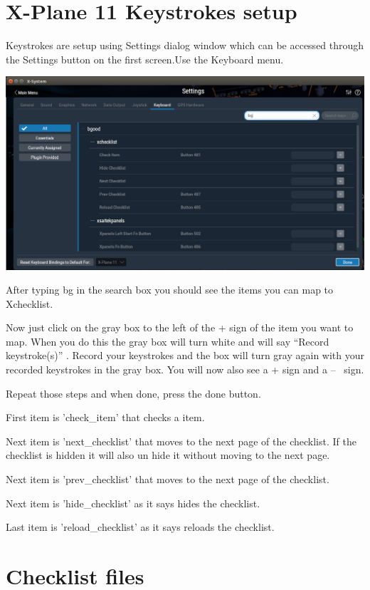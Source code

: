 \documentclass[11pt,parskip=half,a4paper]{scrartcl}
\begin{document}
\section{X-Plane 11 Keystrokes setup}

Keystrokes are setup using Settings dialog window which can be accessed through the Settings button on the first screen.Use the Keyboard menu.

\begin{center}
\includegraphics[width=17cm]{XchecklistUserManual-img004.png}
\end{center}

After typing bg in the search box you should see the items you can map to Xchecklist.

Now just click on the gray box to the left of the + sign of the item you want to map. When you do this the gray box will turn white and will say ``Record keystroke(s)'' . Record your keystrokes and the box will turn gray again with your recorded keystrokes in the gray box. You will now also see a + sign and a -- \ sign.

Repeat those steps and when done, press the done button. 

First item is 'check\_item' that checks a item. 

Next item is 'next\_checklist' that moves to the next page of the checklist. If the checklist is hidden it 
will also un hide it without moving to the next page. 

Next item is 'prev\_checklist' that moves to the next page of the checklist.

Next item is 'hide\_checklist' as it says hides the checklist.

Last item is 'reload\_checklist' as it says reloads the checklist.

\newpage
\section{Checklist files}
\end{document}
